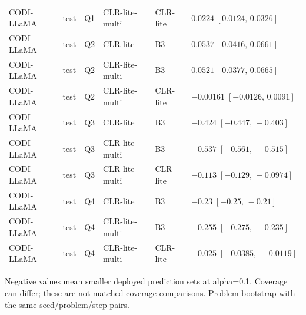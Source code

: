 \begin{longtable}{@{}p{}p{}p{}p{}p{}p{}@{}}
CODI-LLaMA & test & Q1 & CLR-lite-multi & CLR-lite & $0.0224\;[0.0124,\,0.0326]$ \\
CODI-LLaMA & test & Q2 & CLR-lite & B3 & $0.0537\;[0.0416,\,0.0661]$ \\
CODI-LLaMA & test & Q2 & CLR-lite-multi & B3 & $0.0521\;[0.0377,\,0.0665]$ \\
CODI-LLaMA & test & Q2 & CLR-lite-multi & CLR-lite & $-0.00161\;[-0.0126,\,0.0091]$ \\
CODI-LLaMA & test & Q3 & CLR-lite & B3 & $-0.424\;[-0.447,\,-0.403]$ \\
CODI-LLaMA & test & Q3 & CLR-lite-multi & B3 & $-0.537\;[-0.561,\,-0.515]$ \\
CODI-LLaMA & test & Q3 & CLR-lite-multi & CLR-lite & $-0.113\;[-0.129,\,-0.0974]$ \\
CODI-LLaMA & test & Q4 & CLR-lite & B3 & $-0.23\;[-0.25,\,-0.21]$ \\
CODI-LLaMA & test & Q4 & CLR-lite-multi & B3 & $-0.255\;[-0.275,\,-0.235]$ \\
CODI-LLaMA & test & Q4 & CLR-lite-multi & CLR-lite & $-0.025\;[-0.0385,\,-0.0119]$ \\
\bottomrule
\end{longtable}
\noindent Negative values mean smaller deployed prediction sets at alpha=0.1. Coverage can differ; these are not matched-coverage comparisons. Problem bootstrap with the same seed/problem/step pairs.
\endgroup
